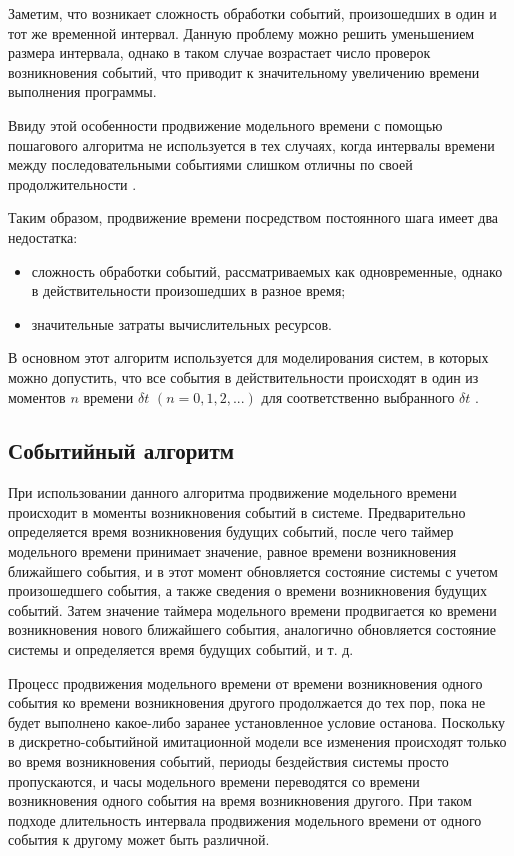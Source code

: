 Заметим, что возникает сложность обработки событий, произошедших в один и тот же временной интервал. Данную проблему можно решить уменьшением размера интервала, однако в таком случае возрастает число проверок возникновения событий, что приводит к значительному увеличению времени выполнения программы. 

Ввиду этой особенности продвижение модельного времени с помощью пошагового алгоритма не используется в тех случаях, когда интервалы времени между последовательными событиями слишком отличны по своей продолжительности \cite{imitation_modelling}. 

Таким образом, продвижение времени посредством постоянного шага имеет два недостатка:
\begin{itemize}
	\item сложность обработки событий, рассматриваемых как одновременные, однако в действительности произошедших в разное время;
	\item  значительные затраты вычислительных ресурсов.
\end{itemize}

В основном этот алгоритм используется для моделирования систем, в которых можно допустить, что все события в действительности происходят в один из моментов $n$ времени $\delta t$ $(n = 0, 1, 2, ...)$ для соответственно выбранного $\delta t$ \cite{imitation_modelling}. 

\subsection{Событийный алгоритм}
При использовании данного алгоритма продвижение модельного времени происходит в моменты возникновения событий в системе.
Предварительно определяется время возникновения будущих событий, после чего таймер модельного времени принимает значение, равное времени возникновения ближайшего события, и в этот момент обновляется состояние системы с учетом произошедшего события, а также сведения о времени  возникновения будущих событий. Затем значение таймера модельного времени продвигается ко времени возникновения нового ближайшего события, аналогично обновляется состояние системы и определяется время будущих событий, и т. д.

Процесс продвижения модельного времени от времени возникновения одного события ко времени возникновения другого продолжается до тех пор, пока не будет выполнено какое-либо заранее установленное условие останова. Поскольку в дискретно-событийной имитационной модели все изменения происходят только во время возникновения событий, периоды бездействия системы просто пропускаются, и часы модельного времени переводятся со времени возникновения одного события на время возникновения другого. При таком подходе длительность интервала продвижения модельного времени от одного события к другому может быть различной.

